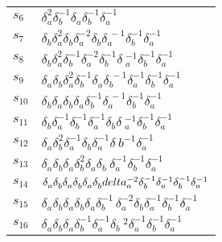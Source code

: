 \documentclass{article}
\begin{document}
\begin{center}
\begin{tabular}{ll}
$s_{6}$ & $\delta_a^{2}\delta_b^{-1}\delta_a^{}\delta_b^{-1}\delta_a^{-1}$ \\
$s_{7}$ & $\delta_b^{}\delta_a^{2}\delta_b^{}\delta_a^{-2}\delta_b^{}\delta_a^{\
-1}\delta_b^{-1}\delta_a^{-1}$ \\
$s_{8}$ & $\delta_b^{}\delta_a^{2}\delta_b^{-1}\delta_a^{-2}\delta_b^{-1}\delta\
_a^{-1}\delta_b^{-1}\delta_a^{-1}$ \\
$s_{9}$ & $\delta_a^{}\delta_b^{}\delta_a^{2}\delta_b^{-1}\delta_a^{}\delta_b^{\
-1}\delta_a^{-1}\delta_b^{-1}\delta_a^{-1}$ \\
$s_{10}$ & $\delta_b^{}\delta_a^{}\delta_b^{}\delta_a^{}\delta_b^{-1}\delta_a^{\
-1}\delta_b^{-1}\delta_a^{-1}$ \\
$s_{11}$ & $\delta_b^{}\delta_a^{-1}\delta_b^{-1}\delta_a^{-1}\delta_b^{}\delta\
_a^{-1}\delta_b^{-1}\delta_a^{-1}$ \\
$s_{12}$ & $\delta_a^{}\delta_b^{2}\delta_a^{-1}\delta_b^{}\delta_a^{-1}\delta_\
b^{-1}\delta_a^{-1}$ \\
$s_{13}$ & $\delta_a^{}\delta_b^{}\delta_a^{}\delta_b^{2}\delta_a^{}\delta_b^{}\
\delta_a^{-1}\delta_b^{-1}\delta_a^{-1}$ \\
$s_{14}$ & $\delta_a^{}\delta_b^{}\delta_a^{}\delta_b^{}\delta_a^{}\delta_b^{}\\
delta_a^{-2}\delta_b^{-1}\delta_a^{-1}\delta_b^{-1}\delta_a^{-1}$ \\
$s_{15}$ & $\delta_a^{}\delta_b^{}\delta_a^{}\delta_b^{}\delta_a^{}\delta_b^{-1\
}\delta_a^{-2}\delta_b^{}\delta_a^{-1}\delta_b^{-1}\delta_a^{-1}$ \\
$s_{16}$ & $\delta_a^{}\delta_b^{}\delta_a^{}\delta_b^{-1}\delta_a^{-1}\delta_b\
^{2}\delta_a^{-1}\delta_b^{-1}\delta_a^{-1}$ \\
\bottomrule
\end{tabular}
\end{center}

\thispagestyle{empty}
\end{document}
